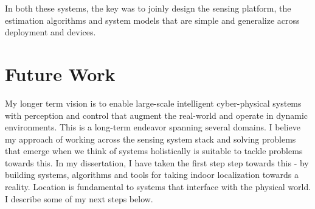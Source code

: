 \documentclass[10pt]{article}
\begin{document}
In both these systems, the key was to joinly design the sensing platform, the estimation algorithms and system models that are simple and generalize across deployment and devices.


\section{Future Work}
My longer term vision is to enable large-scale intelligent cyber-physical systems with perception and control that augment the real-world and operate in dynamic environments. %
This is a long-term endeavor spanning several domains. I believe my approach of working across the sensing system stack and solving problems that emerge when we think of systems holistically is suitable to tackle problems towards this. In my dissertation, I have taken the first step step towards this - by building systems, algorithms and tools for taking indoor localization towards a reality. Location is fundamental to systems that interface with the physical world.  I describe some of my next steps below. %

\end{document}
